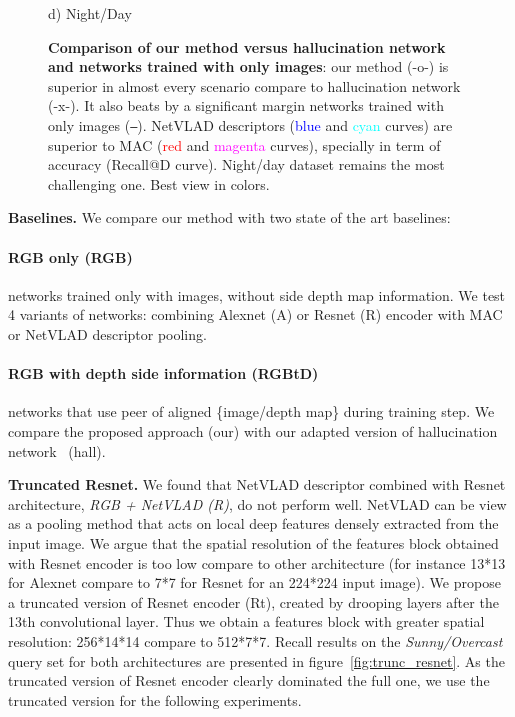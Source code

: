 \begin{figure}
\begin{minipage}{0.85\linewidth}
\begin{minipage}{0.49\linewidth}
		{\scriptsize d) Night/Day}
	\end{minipage}
	
	\end{minipage}

	\caption{\label{fig:results} \textbf{Comparison of our method versus hallucination network and networks trained with only images}: our method (-o-) is superior in almost every scenario compare to hallucination network (-x-). It also beats by a significant margin networks trained with only images (\texttt{--}). NetVLAD descriptors (\textcolor{blue}{blue} and \textcolor{cyan}{cyan} curves) are superior to MAC (\textcolor{red}{red} and \textcolor{magenta}{magenta} curves), specially in term of accuracy (Recall@D curve). Night/day dataset remains the most challenging one.  Best view in colors.}
\end{figure}

\noindent\textbf{Baselines.} We compare our method with two state of the art baselines:
    \paragraph{RGB only (RGB)} networks trained only with images, without side depth map information. We test 4 variants of networks: combining Alexnet (A) or Resnet (R) encoder with MAC or NetVLAD descriptor pooling.
    \paragraph{RGB with depth side information (RGBtD)} networks that use peer of aligned \{image/depth map\} during training step. We compare the proposed approach (our) with our adapted version of hallucination network~\cite{Hoffman2016} (hall).

\noindent\textbf{Truncated Resnet.} We found that NetVLAD descriptor combined with Resnet architecture, \textsl{RGB + NetVLAD (R)}, do not perform well. NetVLAD can be view as a pooling method that acts on local deep features densely extracted from the input image. We argue that the spatial resolution of the features block obtained with Resnet encoder is too low compare to other architecture (for instance 13*13 for Alexnet compare to 7*7 for Resnet for an 224*224 input image). We propose a truncated version of Resnet encoder (Rt), created by drooping layers after the 13th convolutional layer. Thus we obtain a features block with greater spatial resolution: 256*14*14 compare to 512*7*7. Recall results on the \textit{Sunny/Overcast} query set for both architectures are presented in figure~\ref{fig:trunc_resnet}. As the truncated version of Resnet encoder clearly dominated the full one, we use the truncated version for the following experiments.

